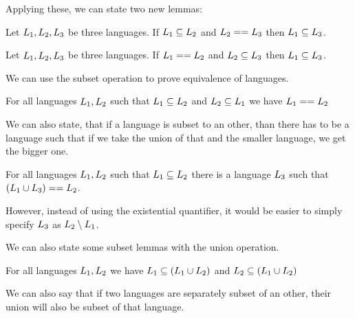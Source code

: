 Applying these, we can state two new lemmas:

\begin{lemma}
	\label{lem:sameAsSubsetTrans}
	Let $L_{1}, L_{2}, L_{3}$ be three languages. If $L_{1} \subseteq L_{2}$ and  $L_{2} == L_{3}$ then  $L_{1} \subseteq L_{3}$.
\end{lemma}

\begin{lemma}
	\label{lem:sameAsSubsetTrans2}
	Let $L_{1}, L_{2}, L_{3}$ be three languages. If $L_{1} == L_{2}$ and  $L_{2} \subseteq L_{3}$ then  $L_{1} \subseteq L_{3}$.
\end{lemma}

We can use the subset operation to prove equivalence of languages.
\begin{lemma}
	\label{subsetSupersetSame}
	For all languages $L_{1}, L_{2}$ such that $L_{1} \subseteq L_{2}$ and $L_{2} \subseteq L_{1}$ we have $L_{1} == L_{2}$
\end{lemma}

We can also state, that if a language is subset to an other, than there has to be a language such that if we take the union of that and the smaller language, we get the bigger one.

\begin{lemma}
	\label{lem:subsetSplit}
	For all languages $L_{1}, L_{2}$ such that $L_{1} \subseteq L_{2}$ there is a language $L_{3}$ such that $(L_{1} \cup L_{3}) == L_{2}$.
\end{lemma}

However, instead of using the existential quantifier, it would be easier to simply specify $L_{3}$ as $L_{2} \setminus L_{1}$.

We can also state some subset lemmas with the union operation.

\begin{lemma}
	\label{lem:inUnionSubset}
	For all languages $L_{1}, L_{2}$ we have $L_{1} \subseteq (L_{1} \cup L_{2})$ and $L_{2} \subseteq (L_{1} \cup L_{2})$
\end{lemma}

We can also say that if two languages are separately subset of an other, their union will also be subset of that language.

